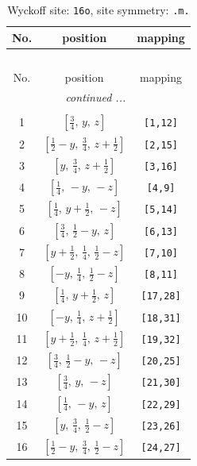 \documentclass[fleqn,8pt]{jsarticle}
\begin{document}
\renewcommand{\arraystretch}{1.2}
\begin{longtable}{ccc}
\caption{Wyckoff site: {\tt 16o}, site symmetry: {\tt .m.}}
 \\
 \hline \hline
No. & position & mapping \\ \hline \endfirsthead

\multicolumn{2}{l}{\tablename\ \thetable{}} \\
 \hline \hline
No. & position & mapping \\ \hline \endhead

 \hline \hline
\multicolumn{2}{r}{\footnotesize\it continued ...} \\ \endfoot

 \hline \hline
\multicolumn{2}{r}{} \\ \endlastfoot

1 & $\left[ \frac{3}{4},\, y,\, z \right]$ & {\tt [1,12]} \\ \hline
2 & $\left[ \frac{1}{2} - y,\, \frac{3}{4},\, z + \frac{1}{2} \right]$ & {\tt [2,15]} \\ \hline
3 & $\left[ y,\, \frac{3}{4},\, z + \frac{1}{2} \right]$ & {\tt [3,16]} \\ \hline
4 & $\left[ \frac{1}{4},\, - y,\, - z \right]$ & {\tt [4,9]} \\ \hline
5 & $\left[ \frac{1}{4},\, y + \frac{1}{2},\, - z \right]$ & {\tt [5,14]} \\ \hline
6 & $\left[ \frac{3}{4},\, \frac{1}{2} - y,\, z \right]$ & {\tt [6,13]} \\ \hline
7 & $\left[ y + \frac{1}{2},\, \frac{1}{4},\, \frac{1}{2} - z \right]$ & {\tt [7,10]} \\ \hline
8 & $\left[ - y,\, \frac{1}{4},\, \frac{1}{2} - z \right]$ & {\tt [8,11]} \\ \hline
9 & $\left[ \frac{1}{4},\, y + \frac{1}{2},\, z \right]$ & {\tt [17,28]} \\ \hline
10 & $\left[ - y,\, \frac{1}{4},\, z + \frac{1}{2} \right]$ & {\tt [18,31]} \\ \hline
11 & $\left[ y + \frac{1}{2},\, \frac{1}{4},\, z + \frac{1}{2} \right]$ & {\tt [19,32]} \\ \hline
12 & $\left[ \frac{3}{4},\, \frac{1}{2} - y,\, - z \right]$ & {\tt [20,25]} \\ \hline
13 & $\left[ \frac{3}{4},\, y,\, - z \right]$ & {\tt [21,30]} \\ \hline
14 & $\left[ \frac{1}{4},\, - y,\, z \right]$ & {\tt [22,29]} \\ \hline
15 & $\left[ y,\, \frac{3}{4},\, \frac{1}{2} - z \right]$ & {\tt [23,26]} \\ \hline
16 & $\left[ \frac{1}{2} - y,\, \frac{3}{4},\, \frac{1}{2} - z \right]$ & {\tt [24,27]} \\
\end{longtable}
\end{document}
